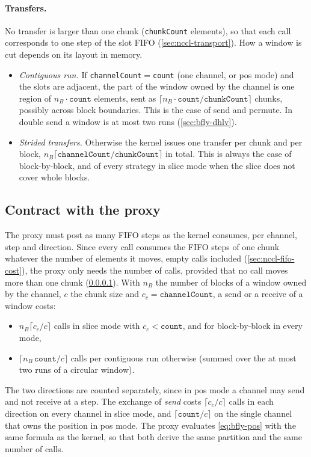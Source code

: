 \paragraph{Transfers.}\label{sec:bfly-fast}
No transfer is larger than one chunk (\texttt{chunkCount} elements), so that each call corresponds to one step of the slot FIFO (\cref{sec:nccl-transport}).
How a window is cut depends on its layout in memory.
\begin{itemize}
  \item \emph{Contiguous run.} If \texttt{channelCount}$=$\texttt{count} (one channel, or pos mode) and the slots are adjacent, the part of the window owned by the channel is one region of $n_B\cdot\texttt{count}$ elements, sent as $\lceil n_B\cdot\texttt{count}/\texttt{chunkCount}\rceil$ chunks, possibly across block boundaries.
  This is the case of send and permute. In double send a window is at most two runs (\cref{sec:bfly-dhlv}).
  \item \emph{Strided transfers.} Otherwise the kernel issues one transfer per chunk and per block, $n_B\lceil\texttt{channelCount}/\texttt{chunkCount}\rceil$ in total.
  This is always the case of block-by-block, and of every strategy in slice mode when the slice does not cover whole blocks.
\end{itemize}

\subsection{Contract with the proxy}\label{sec:bfly-proxy}

The proxy must post as many FIFO steps as the kernel consumes, per channel, step and direction.
Since every call consumes the FIFO steps of one chunk whatever the number of elements it moves, empty calls included (\cref{sec:nccl-fifo-cost}), the proxy only needs the number of calls, provided that no call moves more than one chunk (\cref{sec:bfly-fast}).
With $n_B$ the number of blocks of a window owned by the channel, $c$ the chunk size and $c_c=\texttt{channelCount}$, a send or a receive of a window costs:
\begin{itemize}
  \item $n_B\lceil c_c/c\rceil$ calls in slice mode with $c_c<\texttt{count}$, and for block-by-block in every mode,
  \item $\lceil n_B\,\texttt{count}/c\rceil$ calls per contiguous run otherwise (summed over the at most two runs of a circular window).
\end{itemize}
The two directions are counted separately, since in pos mode a channel may send and not receive at a step.
The exchange of \emph{send} costs $\lceil c_c/c\rceil$ calls in each direction on every channel in slice mode, and $\lceil\texttt{count}/c\rceil$ on the single channel that owns the position in pos mode.
The proxy evaluates \cref{eq:bfly-pos} with the same formula as the kernel, so that both derive the same partition and the same number of calls.


